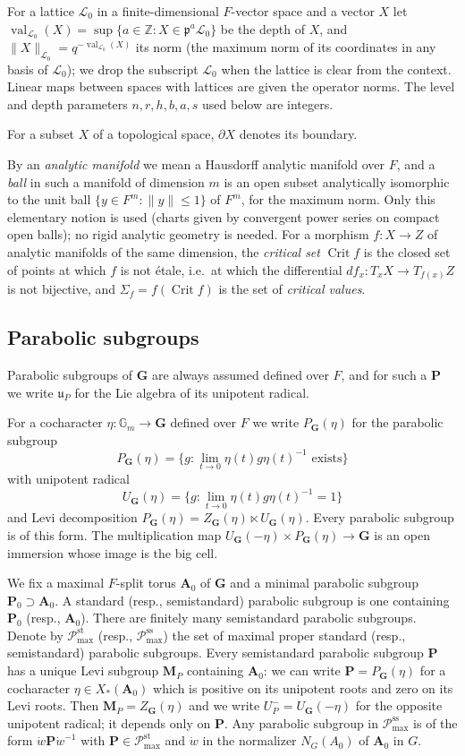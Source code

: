 \documentclass[11pt,reqno]{amsart}
\numberwithin{equation}{section}
\theoremstyle{plain}
\theoremstyle{definition}
\theoremstyle{remark}
\theoremstyle{plain}
\newcommand{\Z}{\mathbb{Z}}      %
\newcommand{\Gm}{\mathbb{G}_m}   %
\newcommand{\pp}{\mathfrak{p}}   %
\newcommand{\Lat}{\mathcal{L}}   %
\newcommand{\bG}{\mathbf{G}}     %
\newcommand{\bA}{\mathbf{A}}     %
\newcommand{\bP}{\mathbf{P}}     %
\newcommand{\bM}{\mathbf{M}}     %
\newcommand{\g}{\mathfrak{g}}    %
\newcommand{\uu}{\mathfrak{u}}   %
\newcommand{\Pc}{\mathscr{P}^{\mathrm{st}}_{\mathrm{max}}}    %
\newcommand{\Pcss}{\mathscr{P}^{\mathrm{ss}}_{\mathrm{max}}}  %
\newcommand{\norm}[1]{\lVert#1\rVert}
\DeclareMathOperator{\val}{val}
\DeclareMathOperator{\Crit}{Crit}
\newcommand{\Crv}{\Sigma}
\begin{document}
For a lattice $\Lat_0$ in a finite-dimensional $F$-vector space and a
vector $X$ let $\val_{\Lat_0}(X)=\sup\{a\in\Z:X\in\pp^a\Lat_0\}$ be
the depth of $X$, and $\norm{X}_{\Lat_0}=q^{-\val_{\Lat_0}(X)}$ its norm (the
maximum norm of its coordinates in any basis of $\Lat_0$); we drop
the subscript $\Lat_0$ when the lattice is clear from the context.
Linear maps between spaces with lattices are given the operator norms.
The level and depth parameters $n,r,h,b,a,s$ used below are integers.

For a subset $X$ of a topological space, $\partial X$ denotes its boundary.

By an \emph{analytic manifold} we mean a Hausdorff analytic manifold
over $F$, and a \emph{ball} in such a manifold of dimension $m$ is an open subset analytically
isomorphic to the unit ball $\{y\in F^m:\norm{y}\le1\}$ of $F^m$, for the maximum norm.
Only this elementary notion is used (charts given by convergent power series on
compact open balls); no rigid analytic geometry is needed.
For a morphism $f:X\to Z$ of analytic manifolds of the same dimension, the \emph{critical set} $\Crit f$ is the closed set
of points at which $f$ is not \'etale, i.e.\ at which the differential
$df_x:T_xX\to T_{f(x)}Z$ is not bijective, and
$\Crv_f=f(\Crit f)$ is the set of \emph{critical values}.

\subsection{Parabolic subgroups}\label{sec:parabolics}

Parabolic subgroups of $\bG$ are always assumed defined over $F$, and for such a $\bP$ we write $\uu_P$ for the Lie algebra of its unipotent radical.


For a cocharacter $\eta:\Gm\to\bG$ defined over $F$ we write $P_\bG(\eta)$ for the parabolic subgroup
\[
P_\bG(\eta)=\{g:\lim_{t\to0}\eta(t)g\eta(t)^{-1}\text{ exists}\}
\]
with unipotent radical
\[
U_\bG(\eta)=\{g:\lim_{t\to0}\eta(t)g\eta(t)^{-1}=1\}
\]
and Levi decomposition $P_\bG(\eta)=Z_\bG(\eta)\ltimes U_\bG(\eta)$.
Every parabolic subgroup is of this form.
The multiplication map $U_\bG(-\eta)\times P_\bG(\eta)\to\bG$ is an open immersion whose image is the big cell.

We fix a maximal $F$-split torus $\bA_0$ of $\bG$ and a minimal parabolic subgroup $\bP_0\supset\bA_0$.
A standard (resp., semistandard) parabolic subgroup is one containing $\bP_0$ (resp., $\bA_0$).
There are finitely many semistandard parabolic subgroups.
Denote by $\Pc$ (resp., $\Pcss$) the set of maximal proper standard (resp., semistandard) parabolic subgroups.
Every semistandard parabolic subgroup $\bP$ has a unique Levi subgroup $\bM_P$ containing $\bA_0$:
we can write $\bP=P_\bG(\eta)$ for a cocharacter $\eta\in X_*(\bA_0)$ which is positive on its unipotent roots and zero on its Levi roots.
Then $\bM_P=Z_\bG(\eta)$ and we write $U_P^-=U_\bG(-\eta)$ for the opposite unipotent radical; it depends only on $\bP$.
Any parabolic subgroup in $\Pcss$ is of the form $\dot w\bP\dot w^{-1}$ with $\bP\in\Pc$ and $\dot w$ in the normalizer $N_G(A_0)$ of $\bA_0$ in $G$.
\end{document}
